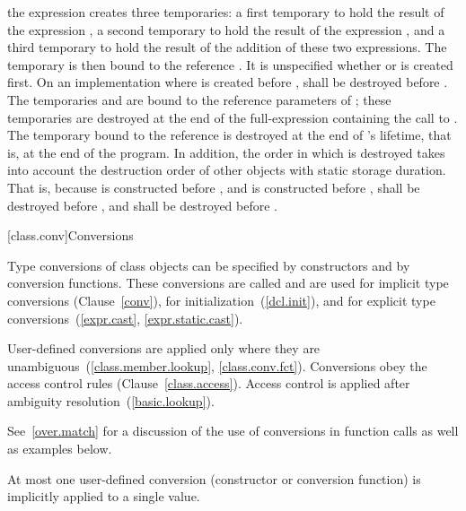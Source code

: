 the expression
creates three temporaries:
a first temporary
to hold the result of the expression
,
a second temporary
to hold the result of the expression
,
and a third temporary
to hold the result of the addition of these two expressions.
The temporary
is then bound to the reference
.
It is unspecified whether
or
is created first.
On an implementation where
is created before
,
shall be destroyed before
.
The temporaries
and
are bound to the reference parameters of
;
these temporaries are destroyed at the end of the full-expression
containing the call to
.
The temporary
bound to the reference
is destroyed at the end of
's
lifetime, that is, at the end of the program.
In addition, the order in which
is destroyed takes into account the destruction order of other objects with
static storage duration.
That is, because
is constructed before
,
and
is constructed before
,
shall be destroyed before
,
and
shall be destroyed before
.
\exitexample

[class.conv]{Conversions}

\pnum
{}%
%
%
%
%
Type conversions of class objects can be specified by constructors and
by conversion functions.
These conversions are called
and are used for implicit type conversions (Clause~\ref{conv}),
for initialization~(\ref{dcl.init}),
and for explicit type conversions~(\ref{expr.cast}, \ref{expr.static.cast}).

\pnum
User-defined conversions are applied only where they are unambiguous~(\ref{class.member.lookup}, \ref{class.conv.fct}).
Conversions obey the access control rules (Clause~\ref{class.access}).
Access control is applied after ambiguity resolution~(\ref{basic.lookup}).

\pnum
\enternote
See~\ref{over.match} for a discussion of the use of conversions in function calls
as well as examples below.
\exitnote

\pnum
{}%
At most one user-defined conversion (constructor or conversion function)
is implicitly applied to a single value.

